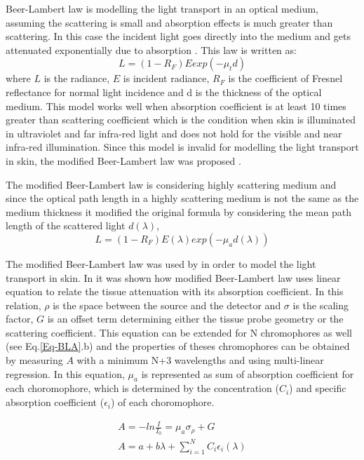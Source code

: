 Beer-Lambert law is modelling the light transport in an optical medium, assuming the scattering is small and absorption effects is much greater than scattering. In this case the incident light goes directly into the medium and gets attenuated exponentially due to absorption \cite{igarashi2007appearance}. This law is written as: 
	\begin{equation}
	 L = (1-R_{F})E exp(-\mu_{t}d)
	\label{eq:BL}
	\end{equation}
where $L$ is the radiance, $E$ is incident radiance, $R_{F}$ is the coefficient of Fresnel reflectance for normal light incidence and d is the thickness of the optical medium. This model works well when absorption coefficient is at least 10 times greater than scattering coefficient which is the condition when skin is illuminated in ultraviolet and far infra-red light and does not hold for the visible and near infra-red illumination. Since this model is invalid for modelling the light transport in skin, the modified Beer-Lambert law was proposed \cite{igarashi2007appearance}.

The modified Beer-Lambert law is considering highly scattering medium and since the optical path length in a highly scattering medium is not the same as the medium thickness it modified the original formula by considering the mean path length of the scattered light $d(\lambda)$, 
	\begin{equation}
	 L = (1-R_{F})E(\lambda) exp(-\mu_{a}d(\lambda))
	\label{eq:BL}
	\end{equation}

The modified Beer-Lambert law was used by \cite{meglinski2003computer,shimada2001melanin,tsumura2003image} in order to model the light transport in skin. In \cite{meglinski2003computer} it was shown how modified Beer-Lambert law uses linear equation to relate the tissue attenuation with its absorption coefficient. In this relation, $\rho$ is the space between the source and the detector and $\sigma$ is the scaling factor, $G$ is an offset term determining either the tissue probe geometry or the scattering coefficient. This equation can be extended for N chromophores as well (see Eq.\ref{Eq-BLA}.b) and the properties of theses chromophores can be obtained by measuring $A$ with a minimum N+3 wavelengths and using multi-linear regression. In this equation, $\mu_{a}$ is represented as sum of absorption coefficient for each choromophore, which is determined by the concentration ($C_{i}$) and specific absorption coefficient ($\epsilon_{i}$) of each choromophore.  

	\begin{subequations}
	\begin{align}
	 A = -ln \frac{I}{I_{0}} = \mu_{a} \sigma_{\rho} + G\\
	 A = a + b\lambda + \sum_{i=1}^{N} C_{i}\epsilon_{i}(\lambda)
	 \end{align}
	\label{Eq-BLA}
	\end{subequations}

